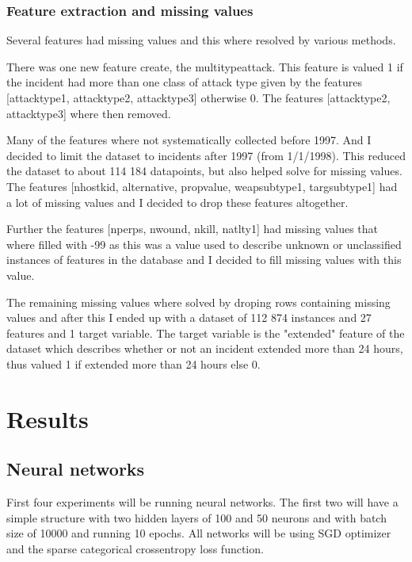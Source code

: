 \documentclass[reprint,english,notitlepage]{revtex4-2}  %
\begin{document}
\subsubsection{Feature extraction and missing values}
Several features had missing values and this where resolved by various methods.   

There was one new feature create, the multitypeattack. This feature is valued 1 if the incident had more than one class of attack type given by the features [attacktype1, attacktype2, attacktype3] otherwise 0. The features [attacktype2, attacktype3] where then removed.  

Many of the features where not systematically collected before 1997. And I decided to limit the dataset to incidents after 1997 (from 1/1/1998). This reduced the dataset to about 114 184 datapoints, but also helped solve for missing values. The features [nhostkid, alternative, propvalue, weapsubtype1, targsubtype1] had a lot of missing values and I decided to drop these features altogether. 

Further the features [nperps, nwound, nkill, natlty1] had missing values that where filled with -99 as this was a value used to describe unknown or unclassified instances of features in the database and I decided to fill missing values with this value. 

The remaining missing values where solved by droping rows containing missing values and after this I ended up with a dataset of 112 874 instances and 27 features and 1 target variable. The target variable is the "extended" feature of the dataset which describes whether or not an incident extended more than 24 hours, thus valued 1 if extended more than 24 hours else 0.   



\newpage


\section{Results}
\subsection{Neural networks}
First four experiments will be running neural networks. The first two will have a simple structure with two hidden layers of 100 and 50 neurons and with batch size of 10000 and running 10 epochs.
All networks will be using SGD optimizer and the sparse categorical crossentropy loss function. 
\newline
\end{document}
